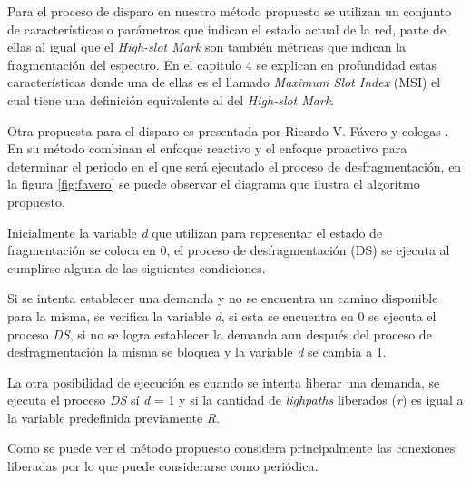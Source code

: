 Para el proceso de disparo en nuestro método propuesto se utilizan un conjunto de características o parámetros que indican el estado actual de la red, parte de ellas al igual que el \textit{High-slot Mark} son también métricas que indican la fragmentación del espectro. En el capitulo 4 se explican en profundidad estas características donde una de ellas es el llamado \textit{Maximum Slot Index} (MSI) el cual tiene una definición equivalente al del \textit{High-slot Mark}. 

Otra propuesta para el disparo es presentada por Ricardo V. Fávero y colegas \cite{favero2015new}. En su método combinan el enfoque reactivo y el enfoque proactivo para determinar el periodo en el que será ejecutado el proceso de desfragmentación, en la figura \ref{fig:favero} se puede observar el diagrama que ilustra el algoritmo propuesto.

Inicialmente la variable \textit{d} que utilizan para representar el estado de fragmentación se coloca en 0, el proceso de desfragmentación (DS) se ejecuta al cumplirse alguna de las siguientes condiciones.

Si se intenta establecer una demanda y no se encuentra un camino disponible para la misma, se verifica la variable \textit{d}, si esta se encuentra en 0 se ejecuta el proceso \textit{DS}, si no se logra establecer la demanda aun después del proceso de desfragmentación la misma se bloquea y la variable \textit{d} se cambia a 1.

La otra posibilidad de ejecución es cuando se intenta liberar una demanda, se ejecuta el proceso \textit{DS} sí \textit{d} = 1 y si la cantidad de \textit{lighpaths} liberados (\textit{r}) es igual a la variable predefinida previamente \textit{R}. 

Como se puede ver el método propuesto considera principalmente las conexiones liberadas por lo que puede considerarse como periódica.


